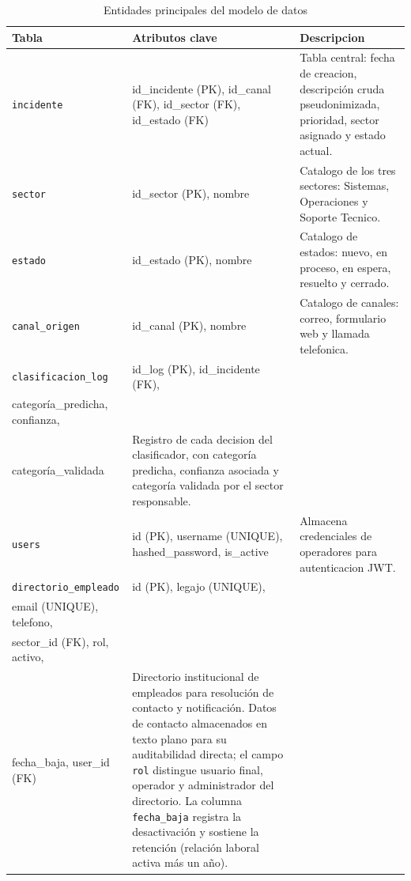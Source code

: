 \begin{table}[htbp]
\centering
\caption{Entidades principales del modelo de datos}
\label{tab:entidades}
\small
\begin{tabular}{@{}p{2.5cm} >{\raggedright\arraybackslash}p{4.8cm} >{\raggedright\arraybackslash}p{5.5cm}@{}}
\toprule
\textbf{Tabla} & \textbf{Atributos clave} & \textbf{Descripcion} \\
\midrule
\texttt{incidente} & id\_incidente (PK), id\_canal (FK), id\_sector (FK), id\_estado (FK) & Tabla central: fecha de creacion, descripción cruda pseudonimizada, prioridad, sector asignado y estado actual. \\
\texttt{sector} & id\_sector (PK), nombre & Catalogo de los tres sectores: Sistemas, Operaciones y Soporte Tecnico. \\
\texttt{estado} & id\_estado (PK), nombre & Catalogo de estados: nuevo, en proceso, en espera, resuelto y cerrado. \\
\texttt{canal\_origen} & id\_canal (PK), nombre & Catalogo de canales: correo, formulario web y llamada telefonica. \\
\texttt{clasificacion\_log} & id\_log (PK), id\_incidente (FK), \\ categoría\_predicha, confianza, \\ categoría\_validada & Registro de cada decision del clasificador, con categoría predicha, confianza asociada y categoría validada por el sector responsable. \\
\texttt{users} & id (PK), username (UNIQUE), hashed\_password, is\_active & Almacena credenciales de operadores para autenticacion JWT. \\
\texttt{directorio\_empleado} & id (PK), legajo (UNIQUE), \\ email (UNIQUE), telefono, \\ sector\_id (FK), rol, activo, \\ fecha\_baja, user\_id (FK) & Directorio institucional de empleados para resolución de contacto y notificación. Datos de contacto almacenados en texto plano para su auditabilidad directa; el campo \texttt{rol} distingue usuario final, operador y administrador del directorio. La columna \texttt{fecha\_baja} registra la desactivación y sostiene la retención (relación laboral activa más un año). \\
\bottomrule
\end{tabular}
\end{table}

